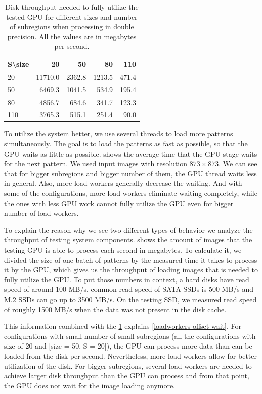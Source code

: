\begin{table}[]
	\centering
	\begin{tabular}{@{}l|rrrr@{}}
		S\textbackslash size &      20 &     50 &     80 &   110 \\ \midrule
		20                   & 11710.0 & 2362.8 & 1213.5 & 471.4 \\
		50                   &  6469.3 & 1041.5 &  534.9 & 195.4 \\
		80                   &  4856.7 &  684.6 &  341.7 & 123.3 \\
		110                  &  3765.3 &  515.1 &  251.4 &  90.0
	\end{tabular}
	\caption{Disk throughput needed to fully utilize the tested GPU for different sizes and number of subregions when processing in double precision. All the values are in megabytes per second.}
	\label{loadworkers-table}
\end{table}

To utilize the system better, we use several threads to load more patterns simultaneously. The goal is to load the patterns as fast as possible, so that the GPU waits as little as possible.  shows the average time that the GPU stage waits for the next pattern. We used input images with resolution $873\times873$. We can see that for bigger subregions and bigger number of them, the GPU thread waits less in general. Also, more load workers generally decrease the waiting. And with some of the configurations, more load workers eliminate waiting completely, while the ones with less GPU work cannot fully utilize the GPU even for bigger number of load workers.

To explain the reason why we see two different types of behavior we analyze the throughput of testing system components.  shows the amount of images that the testing GPU is able to process each second in megabytes. To calculate it, we divided the size of one batch of patterns by the measured time it takes to process it by the GPU, which gives us the throughput of loading images that is needed to fully utilize the GPU. To put those numbers in context, a hard disks have read speed of around 100 MB/s, common read speed of SATA SSDs is 500 MB/s and M.2 SSDs can go up to 3500 MB/s. On the testing SSD, we measured read speed of roughly 1500 MB/s when the data was not present in the disk cache.

This information combined with the \cref{loadworkers-table} explains \cref{loadworkers-offset-wait}. For configurations with small number of small subregions (all the configurations with size of 20 and [size = 50, S = 20]), the GPU can process more data than can be loaded from the disk per second. Nevertheless, more load workers allow for better utilization of the disk. For bigger subregions, several load workers are needed to achieve larger disk throughput than the GPU can process and from that point, the GPU does not wait for the image loading anymore.

